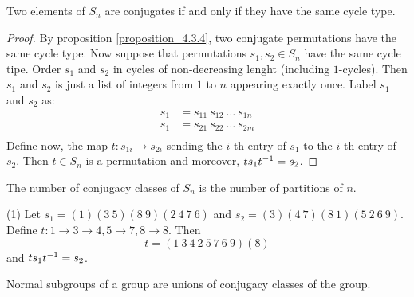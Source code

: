 \begin{proposition}\label{proposition_4.3.5}
  Two elements of $S_n$ are conjugates if and only if they have the same cycle
  type.
\end{proposition}
\begin{proof}
  By proposition \ref{proposition_4.3.4}, two conjugate permutations have the same cycle type.
  Now suppose that permutations $s_1,s_2 \in S_n$ have the same cycle tipe.
  Order $s_1$ and $s_2$ in cycles of non-decreasing lenght (including
  $1$-cycles). Then $s_1$ and $s_2$ is just a list of integers from $1$ to
  $n$ appearing exactly once. Label  $s_1$ and $s_2$ as:
  \begin{align*}
    s_1     &=      s_{11} \ s_{12} \ \dots \ s_{1n}   \\
    s_1     &=      s_{21} \ s_{22} \ \dots \ s_{2m}   \\
  \end{align*}
  Define now, the map $t:s_{1i} \xrightarrow{} s_{2i}$ sending the $i$-th
  entry of  $s_1$ to the $i$-th entry of $s_2$. Then $t \in S_n$ is a
  permutation and moreover,  $ts_1t^{-1}=s_2$.
\end{proof}
\begin{corollary}
  The number of conjugacy classes of $S_n$ is the number of partitions of
  $n$.
\end{corollary}

\begin{example}\label{example_4.9}
\item[(1)] Let $s_1=(1)(3 \ 5)(8 \ 9)(2 \ 4 \ 7 \ 6)$ and $s_2=(3)(4 \ 7)(8 \
  1)(5 \ 2 \ 6 \ 9)$. Define $t:1 \xrightarrow{} 3 \xrightarrow{} 4, 5
  \xrightarrow{} 7, 8 \xrightarrow{} 8$. Then
  \begin{equation*}
    t=(1 \ 3 \ 4 \ 2 \ 5 \ 7 \ 6 \ 9)(8)
  \end{equation*}
  and $ts_1t^{-1}=s_2$.
\end{example}

\begin{proposition}\label{proposition_4.3.6}
  Normal subgroups of a group are unions of conjugacy classes of the group.
\end{proposition}

